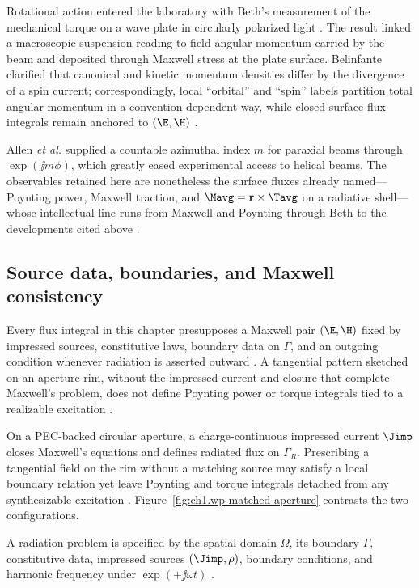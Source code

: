 Rotational action entered the laboratory with Beth's measurement of the
mechanical torque on a wave plate in circularly polarized light \cite{beth1936}. The result
linked a macroscopic suspension reading to field angular momentum carried by the beam and
deposited through Maxwell stress at the plate surface. Belinfante
\cite{belinfante1940} clarified that canonical and kinetic momentum densities differ by
the divergence of a spin current; correspondingly, local ``orbital'' and ``spin''
labels partition total angular momentum in a convention-dependent way, while closed-surface
flux integrals remain anchored to $(\E,\H)$ \cite{belinfante1940,stratton1941}.

Allen \emph{et al.} \cite{allen1992} supplied a countable azimuthal index $m$ for paraxial
beams through $\exp(\jj m\phi)$, which greatly eased experimental access to helical beams.
The observables retained here are nonetheless the surface fluxes already named---Poynting
power, Maxwell traction, and $\Mavg=\mathbf{r}\times\Tavg$ on a radiative shell---whose
intellectual line runs from Maxwell and Poynting through Beth to the developments cited
above \cite{poynting1884,beth1936,allen1992}.
\subsection{Source data, boundaries, and Maxwell consistency}
\label{sec:ch01.0.1}

Every flux integral in this chapter presupposes a Maxwell pair $(\E,\H)$ fixed by impressed
sources, constitutive laws, boundary data on $\Gamma$, and an outgoing condition whenever
radiation is asserted outward \cite{stratton1941,maxwell1873}. A tangential pattern sketched
on an aperture rim, without the impressed current and closure that complete Maxwell's problem,
does not define Poynting power or torque integrals tied to a realizable excitation
\cite{harrington2001}.

On a PEC-backed circular aperture, a charge-continuous impressed current $\Jimp$ closes Maxwell's equations and defines radiated flux on $\Gamma_R$. Prescribing a tangential field on the rim without a matching source may satisfy a local boundary relation yet leave Poynting and torque integrals detached from any synthesizable excitation \cite{stratton1941,harrington2001}. Figure~\ref{fig:ch1.wp-matched-aperture} contrasts the two configurations.

A radiation problem is specified by the spatial domain $\Omega$, its boundary $\Gamma$, constitutive data, impressed sources $(\Jimp,\rho)$, boundary conditions, and harmonic frequency under $\exp(+\jj\omega t)$ \cite{stratton1941}.

